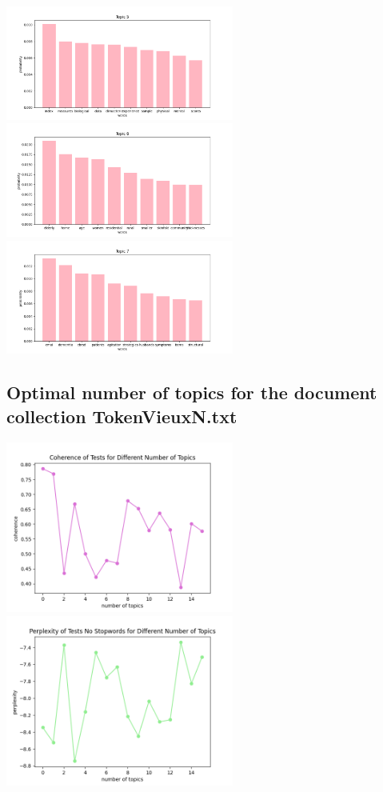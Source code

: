 \documentclass[10pt]{article} %
\begin{document}
\begin{center}
		\includegraphics[width=7.5cm]{images/plots/test_8_no_stopwords_dataset_2/topic_5.png}
		\includegraphics[width=7.5cm]{images/plots/test_8_no_stopwords_dataset_2/topic_6.png}
		\includegraphics[width=7.5cm]{images/plots/test_8_no_stopwords_dataset_2/topic_7.png}	
	\end{center}

	\subsection{Optimal number of topics for the document collection TokenVieuxN.txt}
	\begin{center}
		\includegraphics[width=7.5cm]{images/coherence_no_stopwords_diff_n_topics_2}
		\includegraphics[width=7.5cm]{images/perplexity_no_stopwords_diff_n_topics_2}
	\end{center}
	
\end{document}

